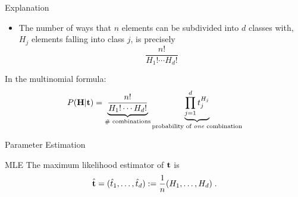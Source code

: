 \documentclass[dvipsnames,mathserif]{beamer}
\begin{document}
{\begin{frame}{Explanation}
\begin{itemize}
    \item The number of ways that $n$ elements can be subdivided into
      $d$ classes with, $H_j$ elements falling into class $j$, is
      precisely
      \begin{equation*}
        \frac{n!}{H_1!\cdots H_d!}
      \end{equation*}
    \end{itemize}
    In the multinomial formula:
\vspace{-1mm}
    \begin{equation*}
      P(\mathbf{H}|\mathbf{t})=\underbrace{\frac{n!}{H_1!\cdots H_d!}}_{\text{\#
          combinations}}\underbrace{\prod_{j=1}^d
        t_j^{H_j}}_{\text{probability of \emph{one} combination}}
    \end{equation*}
\end{frame}

\begin{frame}{Parameter Estimation}
  \begin{block}{MLE}
    The maximum likelihood estimator of $\mathbf{t}$ is
    \begin{equation*}
      \hat{\mathbf{t}}=(\hat{t}_1,\ldots,\hat{t}_d)
      :=\frac{1}{n}(H_1,\ldots,H_d) \;.
    \end{equation*}
  \end{block}
\end{frame}

}
\end{document}
